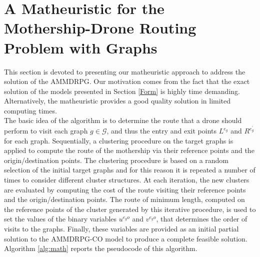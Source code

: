 \documentclass[10pt,a4paper]{elsarticle}
\def\AMD{{\sf AMMDRPG\xspace}}
\def\AMDCO{{\sf AMMDRPG-CO\xspace}}
\newcommand{\EN}[1]{{\color{black}#1}}
\begin{document}
\section{A Matheuristic for the Mothership-Drone Routing Problem with Graphs}\label{Math}
\noindent
This section is devoted to present\EN{ing} our matheuristic approach to address the solution of the \AMD. Our motivation comes from the fact that the exact solution of the models presented in Section \ref{Form} is highly time demanding. Alternatively, the matheuristic provides a good quality solution in limited computing times.\\
\noindent
The basic idea of the algorithm is to determine the route that a drone should perform \EN{to visit} each graph $g \in \mathcal{G}$, and thus the entry and exit points $L^{e_{g}}$ and $R^{e^{'}_{g}}$ for each graph.
Sequentially, a clustering procedure on the target graphs is applied to compute the route of the mothership via their reference points and the origin/destination points.
The clustering procedure is based on a random selection of the initial target graphs and for this reason it is repeated a number of times to consider different cluster structures. At each iteration, the new clusters are evaluated by computing the cost of the route visiting their reference points and the origin/destination points. 
The route of minimum length, computed on the reference points of the cluster generated by this iterative procedure, is used to set the values of the binary variables $u^{e_go}$ and $v^{e_go}$, that determines the order of visits to the graphs. Finally, these variables are provided as an initial partial solution to the \AMDCO\xspace model to produce a complete feasible solution.\\
Algorithm \ref{alg:math} reports the pseudocode of this algorithm.
\end{document}

